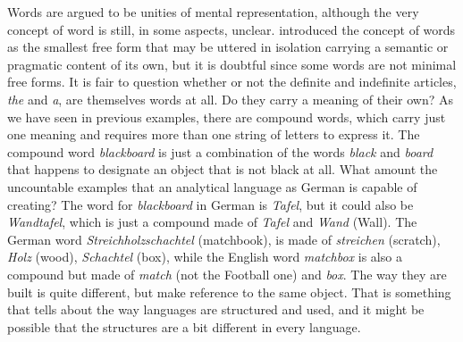 Words are argued to be unities of mental representation,
although the very concept of word is still, in some aspects, unclear.
\cite{bloomfield1926} introduced the concept of words as the 
smallest free form that may be uttered in isolation carrying a semantic 
or pragmatic content of its own, but it is doubtful since some words are not minimal free forms.
It is fair to question whether or not
the definite and indefinite articles, \textit{the} and \textit{a}, are themselves words at all.
Do they carry a meaning of their own? 
As we have seen in previous examples, there are compound words, which carry just one meaning
and requires more than one string of letters to express it.
The compound word \textit{blackboard}
is just a combination of the words \textit{black} and \textit{board} that happens to designate
an object that is not black at all. What amount the uncountable examples that an analytical language
as German is capable of creating? The word for \textit{blackboard} in German is \textit{Tafel}, but
it could also be \textit{Wandtafel}, which is just a compound made of \textit{Tafel} and \textit{Wand}
(Wall). The German word \textit{Streichholzschachtel} (matchbook), is made of
\textit{streichen} (scratch), \textit{Holz} (wood), \textit{Schachtel} (box), while the English
word \textit{matchbox} is also a compound but made of \textit{match} (not the Football one) and
\textit{box}. The way they are built is quite different, but make reference to the same object.
That is something that tells about the way languages are structured and used, and it might be
possible that the structures are a bit different in every language. 

